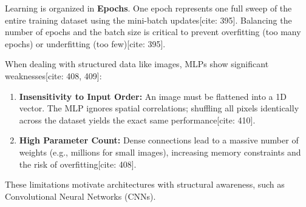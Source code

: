 \begin{remark}[Epochs]
Learning is organized in \textbf{Epochs}. One epoch represents one full sweep of the entire training dataset using the mini-batch updates[cite: 395]. Balancing the number of epochs and the batch size is critical to prevent overfitting (too many epochs) or underfitting (too few)[cite: 395].
\end{remark}

\begin{remark}
When dealing with structured data like images, MLPs show significant weaknesses[cite: 408, 409]:
\begin{enumerate}
    \item \textbf{Insensitivity to Input Order:} An image must be flattened into a 1D vector. The MLP ignores spatial correlations; shuffling all pixels identically across the dataset yields the exact same performance[cite: 410].
    \item \textbf{High Parameter Count:} Dense connections lead to a massive number of weights (e.g., millions for small images), increasing memory constraints and the risk of overfitting[cite: 408].
\end{enumerate}
These limitations motivate architectures with structural awareness, such as Convolutional Neural Networks (CNNs).
\end{remark}
